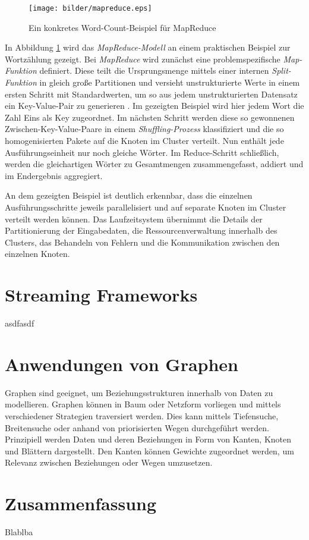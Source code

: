 \begin{figure}[htb!]
\centering
\texttt{[image: bilder/mapreduce.eps]}
\caption{Ein konkretes Word-Count-Beispiel für MapReduce}
\label{fig:wordcount}
\end{figure}   
 


In Abbildung \ref{fig:wordcount} wird das \textit{MapReduce-Modell} an einem praktischen Beispiel zur Wortzählung gezeigt. Bei \textit{MapReduce} wird zunächst eine problemspezifische \textit{Map-Funktion} definiert. Diese teilt die Ursprungsmenge mittels einer internen \textit{Split-Funktion} in gleich große Partitionen und versieht unstrukturierte Werte in einem ersten Schritt mit Standardwerten, um so aus jedem unstrukturierten Datensatz ein Key-Value-Pair zu generieren . Im gezeigten Beispiel wird hier jedem Wort die Zahl Eins als Key zugeordnet. Im nächsten Schritt werden diese so gewonnenen Zwischen-Key-Value-Paare in einem \textit{Shuffling-Prozess} klassifiziert und die so homogenisierten Pakete auf die Knoten im Cluster verteilt. Nun enthält jede Ausführungseinheit nur noch gleiche Wörter. Im Reduce-Schritt schließlich, werden die gleichartigen Wörter zu Gesamtmengen zusammengefasst, addiert und im Endergebnis aggregiert. 

An dem gezeigten Beispiel ist deutlich erkennbar, dass die einzelnen Ausführungsschritte jeweils parallelisiert und auf separate Knoten im Cluster verteilt werden können. Das Laufzeitsystem übernimmt die Details der Partitionierung der Eingabedaten, die Ressourcenverwaltung innerhalb des Clusters, das Behandeln von Fehlern und die Kommunikation zwischen den einzelnen Knoten. 
 

\section{Streaming Frameworks}
\label{section:streaming framworks}
asdfasdf

\section{Anwendungen von Graphen}
\label{section:anwendungen von graphen}

Graphen sind geeignet, um Beziehungsstrukturen innerhalb von Daten zu modellieren. Graphen können in Baum oder Netzform vorliegen und mittels verschiedener Strategien traversiert werden. Dies kann mittels Tiefensuche, Breitensuche oder anhand von priorisierten Wegen durchgeführt werden. Prinzipiell werden Daten und deren Beziehungen in Form von Kanten, Knoten und Blättern dargestellt. Den Kanten können Gewichte zugeordnet werden, um Relevanz zwischen Beziehungen oder Wegen umzusetzen. 

\section{Zusammenfassung}
\label{section:streaming framworks}

Blablba